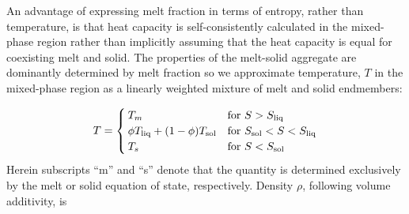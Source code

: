An advantage of expressing melt fraction in terms of entropy, rather than temperature, is that heat capacity is self-consistently calculated in the mixed-phase region rather than implicitly assuming that the heat capacity is equal for coexisting melt and solid.  The properties of the melt-solid aggregate are dominantly determined by melt fraction so we approximate temperature, $T$ in the mixed-phase region as a linearly weighted mixture of melt and solid endmembers:

\begin{equation}
T=
\begin{cases}
\label{eqn:temperature_agg}
  T_m & \text{for } S>S_{\rm liq} \\
  \phi T_{\rm liq} + (1-\phi) T_{\rm sol} & \text{for } S_{\rm sol}<S<S_{\rm liq} \\  
  T_s & \text{for } S<S_{\rm sol}
\end{cases}
\end{equation}
Herein subscripts ``m'' and ``s'' denote that the quantity is determined exclusively by the melt or solid equation of state, respectively.  Density $\rho$, following volume additivity, is

